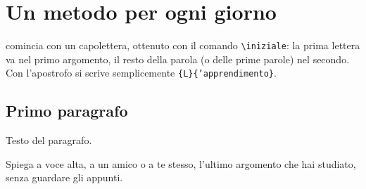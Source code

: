 \chapter{Un metodo per ogni giorno}
\label{cap:metodo}


 comincia con un capolettera, ottenuto
con il comando \texttt{\small\textbackslash iniziale}: la prima
lettera va nel primo argomento, il resto della parola (o delle prime
parole) nel secondo. Con l'apostrofo si scrive semplicemente
\texttt{\small\{L\}\{'apprendimento\}}.

\section{Primo paragrafo}

Testo del paragrafo.

\begin{esercizio}
Spiega a voce alta, a un amico o a te stesso, l'ultimo argomento che
hai studiato, senza guardare gli appunti.
\end{esercizio}

\finecapitolo
